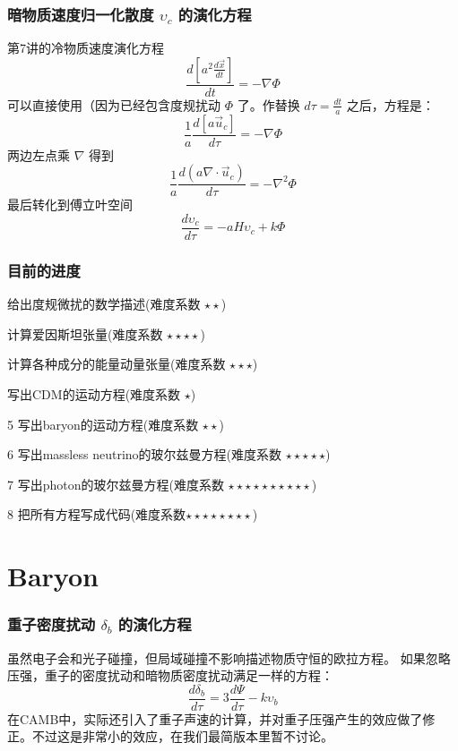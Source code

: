 \documentclass[CJK,13pt]{beamer}
\begin{document}
    \begin{frame}
      \frametitle{暗物质速度归一化散度 $\upsilon_c$ 的演化方程}
      第7讲的冷物质速度演化方程
      $$\frac{d\left[a^2\frac{d\vec{x}}{dt}\right]}{dt} = -\nabla\Phi$$
      可以直接使用（因为已经包含度规扰动 $\Phi$ 了。作替换 $d\tau = \frac{dt}{a}$ 之后，方程是：
        $$\frac{1}{a}\frac{d\left[a\vec{u}_c\right]}{d\tau} = -\nabla\Phi$$
        两边左点乘 $\nabla$ 得到
        $$\frac{1}{a}\frac{d(a\nabla\cdot \vec{u}_c)}{d\tau} = -\nabla^2\Phi $$
        最后转化到傅立叶空间
        {\blue $$ \frac{d\upsilon_c}{d\tau} = -aH\upsilon_c  + k \Phi $$}       
    \end{frame}

  
  \begin{frame}
    \frametitle{目前的进度}
    \bitem
  \item[\checkmark]{给出度规微扰的数学描述(难度系数 $\star\star$)}
  \item[\checkmark]{计算爱因斯坦张量(难度系数 $\star\star\star\star$)}
  \item[\checkmark]{计算各种成分的能量动量张量(难度系数 $\star\star\star$)}    
  \item[\checkmark]{写出CDM的运动方程(难度系数 $\star$)}
  \item[5]{写出baryon的运动方程(难度系数 $\star\star$)}        
  \item[6]{写出massless neutrino的玻尔兹曼方程(难度系数 $\star\star\star\star\star$)}
  \item[7]{写出photon的玻尔兹曼方程(难度系数 $\star\star\star\star\star\star\star\star\star\star$)}
  \item[8]{把所有方程写成代码(难度系数$\star\star\star\star\star\star\star\star$)}
    \eitem
  \end{frame}

  \section{Baryon}

  
    \begin{frame}
      \frametitle{重子密度扰动 $\delta_b$ 的演化方程}
      虽然电子会和光子碰撞，但局域碰撞不影响描述物质守恒的欧拉方程。 如果忽略压强，重子的密度扰动和暗物质密度扰动满足一样的方程：
      {\blue      $$ \frac{d\delta_b}{d\tau} = 3\frac{d\Psi}{d\tau} - k\upsilon_b $$}
      在CAMB中，实际还引入了重子声速的计算，并对重子压强产生的效应做了修正。不过这是非常小的效应，在我们最简版本里暂不讨论。
    \end{frame}
    
\end{document}
